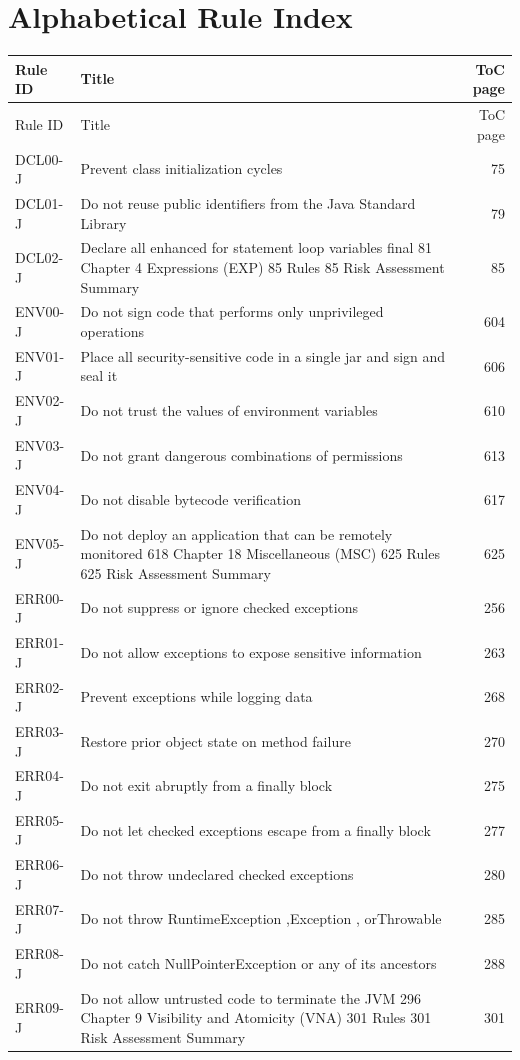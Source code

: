 \documentclass[11pt]{report}
\begin{document}
\chapter{Alphabetical Rule Index}
\begin{longtable}{@{}llr@{}}
\toprule
Rule ID & Title & ToC page\\
\midrule
\endfirsthead
\toprule
Rule ID & Title & ToC page\\
\midrule
\endhead
\bottomrule
\endfoot
DCL00-J & Prevent class initialization cycles & 75\\
DCL01-J & Do not reuse public identifiers from the Java Standard Library & 79\\
DCL02-J & Declare all enhanced for statement loop variables final 81 Chapter 4 Expressions (EXP) 85 Rules 85 Risk Assessment Summary & 85\\
ENV00-J & Do not sign code that performs only unprivileged operations & 604\\
ENV01-J & Place all security-sensitive code in a single jar and sign and seal it & 606\\
ENV02-J & Do not trust the values of environment variables & 610\\
ENV03-J & Do not grant dangerous combinations of permissions & 613\\
ENV04-J & Do not disable bytecode verification & 617\\
ENV05-J & Do not deploy an application that can be remotely monitored 618 Chapter 18 Miscellaneous (MSC) 625 Rules 625 Risk Assessment Summary & 625\\
ERR00-J & Do not suppress or ignore checked exceptions & 256\\
ERR01-J & Do not allow exceptions to expose sensitive information & 263\\
ERR02-J & Prevent exceptions while logging data & 268\\
ERR03-J & Restore prior object state on method failure & 270\\
ERR04-J & Do not exit abruptly from a finally block & 275\\
ERR05-J & Do not let checked exceptions escape from a finally block & 277\\
ERR06-J & Do not throw undeclared checked exceptions & 280\\
ERR07-J & Do not throw RuntimeException ,Exception , orThrowable & 285\\
ERR08-J & Do not catch NullPointerException or any of its ancestors & 288\\
ERR09-J & Do not allow untrusted code to terminate the JVM 296 Chapter 9 Visibility and Atomicity (VNA) 301 Rules 301 Risk Assessment Summary & 301\\

\end{longtable}
\end{document}
